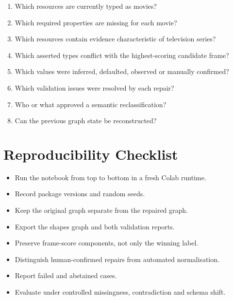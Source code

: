 \documentclass[11pt,a4paper]{article}
\begin{document}
\begin{enumerate}
  \item Which resources are currently typed as movies?
  \item Which required properties are missing for each movie?
  \item Which resources contain evidence characteristic of television series?
  \item Which asserted types conflict with the highest-scoring candidate frame?
  \item Which values were inferred, defaulted, observed or manually confirmed?
  \item Which validation issues were resolved by each repair?
  \item Who or what approved a semantic reclassification?
  \item Can the previous graph state be reconstructed?
\end{enumerate}

\section{Reproducibility Checklist}

\begin{itemize}
  \item Run the notebook from top to bottom in a fresh Colab runtime.
  \item Record package versions and random seeds.
  \item Keep the original graph separate from the repaired graph.
  \item Export the shapes graph and both validation reports.
  \item Preserve frame-score components, not only the winning label.
  \item Distinguish human-confirmed repairs from automated normalisation.
  \item Report failed and abstained cases.
  \item Evaluate under controlled missingness, contradiction and schema shift.
\end{itemize}
\end{document}
